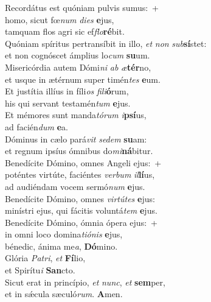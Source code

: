 \evenverse Recordátus est quóniam pulvis sumus:~+\\\evenverse  homo, sicut fœ\textit{num} \textit{di}\textit{es} \textbf{e}jus,~\*\\
\evenverse tamquam flos agri sic ef\textit{flo}\textbf{ré}bit.\\
\oddverse Quóniam spíritus pertransíbit in illo, \textit{et} \textit{non} \textit{sub}\textbf{sí}stet:~\*\\
\oddverse et non cognóscet ámplius lo\textit{cum} \textbf{su}um.\\
\evenverse Misericórdia autem Dómi\textit{ni} \textit{ab} \textit{æ}\textbf{tér}no,~\*\\
\evenverse et usque in ætérnum super timén\textit{tes} \textbf{e}um.\\
\oddverse Et justítia illíus in fíli\textit{os} \textit{fi}\textit{li}\textbf{ó}rum,~\*\\
\oddverse his qui servant testamén\textit{tum} \textbf{e}jus.\\
\evenverse Et mémores sunt manda\textit{tó}\textit{rum} \textit{i}\textbf{psí}us,~\*\\
\evenverse ad facién\textit{dum} \textbf{e}a.\\
\oddverse Dóminus in cælo pará\textit{vit} \textit{se}\textit{dem} \textbf{su}am:~\*\\
\oddverse et regnum ipsíus ómnibus do\textit{mi}\textbf{ná}bitur.\\
\evenverse Benedícite Dómino, omnes Angeli ejus:~+\\
\evenverse  poténtes virtúte, faciéntes \textit{ver}\textit{bum} \textit{il}\textbf{lí}us,~\*\\
\evenverse ad audiéndam vocem sermó\textit{num} \textbf{e}jus.\\
\oddverse Benedícite Dómino, omnes \textit{vir}\textit{tú}\textit{tes} \textbf{e}jus:~\*\\
\oddverse minístri ejus, qui fácitis voluntá\textit{tem} \textbf{e}jus.\\
\evenverse Benedícite Dómino, ómnia ópera ejus:~+\\
\evenverse  in omni loco domina\textit{ti}\textit{ó}\textit{nis} \textbf{e}jus,~\*\\
\evenverse bénedic, ánima me\textit{a}, \textbf{Dó}mino.\\
\oddverse Glória \textit{Pa}\textit{tri}, \textit{et} \textbf{Fí}lio,~\*\\
\oddverse et Spirítu\textit{i} \textbf{San}cto.\\
\evenverse Sicut erat in princípio, \textit{et} \textit{nunc}, \textit{et} \textbf{sem}per,~\*\\
\evenverse et in sǽcula sæculó\textit{rum}. \textbf{A}men.\\
